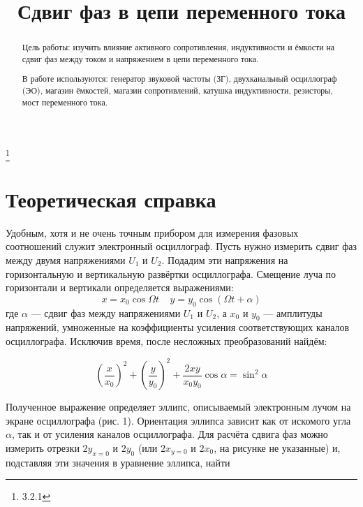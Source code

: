 


\title{Сдвиг фаз в цепи переменного тока}
\thanks{3.2.1}



\begin{abstract}
Цель работы: изучить влияние активного сопротивления, индуктивности и ёмкости на сдвиг фаз между током и напряжением в цепи переменного тока.

В работе используются: генератор звуковой частоты (ЗГ), двухканальный осциллограф (ЭО), магазин ёмкостей, магазин сопротивлений, катушка индуктивности, резисторы, мост переменного тока.

\end{abstract}

\maketitle


\section{\label{sec:level1}Теоретическая справка}

Удобным, хотя и не очень точным прибором для измерения фазовых соотношений служит электронный осциллограф. Пусть нужно измерить сдвиг фаз между двумя напряжениями $U_1$ и $U_2$. Подадим эти напряжения на горизонтальную и вертикальную развёртки осциллографа. Смещение луча по горизонтали и вертикали определяется выражениями:
$$ x = x_0 \cos{\Omega t} ~~~~~ y = y_0 \cos{(\Omega t + \alpha)}$$
где $\alpha$ — сдвиг фаз между напряжениями $U_1$ и $U_2$, а $x_0$ и $y_0$ — амплитуды напряжений, умноженные на коэффициенты усиления соответствующих каналов осциллографа. Исключив время, после несложных преобразований найдём:

$$ \left( \frac{x}{x_0} \right)^2 + \left( \frac{y}{y_0} \right)^2 + \frac{2 x y}{x_0 y_0} \cos{\alpha} = \sin^2{\alpha}$$

Полученное выражение определяет эллипс, описываемый электронным лучом на экране осциллографа (рис. 1). Ориентация эллипса зависит как от искомого угла $\alpha$, так и от усиления каналов осциллографа. Для расчёта сдвига фаз можно измерить отрезки $2 y_{x=0}$ и $2y_0$ (или $2 x_{y=0}$ и $2x_0$, на рисунке не указанные) и, подставляя эти значения в уравнение эллипса, найти

